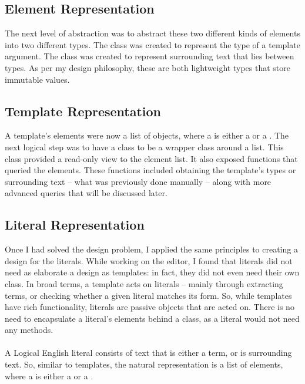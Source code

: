 \documentclass[../main.tex]{subfiles}
\begin{document}
\subsection{Element Representation}
The next level of abstraction was to abstract these two different kinds of elements into two different types.
The class  was created to represent the type of a template argument. The class  was created to represent surrounding text that lies between types. As per my design philosophy, these are both lightweight types that store immutable values.

\subsection{Template Representation}
A template's elements were now a list of  objects, where a  is either a  or a .
The next logical step was to have a  class to be a wrapper class around a  list. This  class provided a read-only view to the element list. It also exposed functions that queried the elements. These functions included obtaining the template's types or surrounding text -- what was previously done manually -- along with more advanced queries that will be discussed later.

\subsection{Literal Representation}
Once I had solved the  design problem, I applied the same principles to creating a design for the literals. While working on the editor, I found that literals did not need as elaborate a design as templates: in fact, they did not even need their own class. In broad terms, a template acts on literals -- mainly through extracting terms, or checking whether a given literal matches its form. So, while templates have rich functionality, literals are passive objects that are acted on. There is no need to encapsulate a literal's elements behind a class, as a literal would not need any methods.
\\
\\
A Logical English literal consists of text that is either a term, or is surrounding text. So, similar to templates, the natural representation is a list of  elements, where a  is either a  or a .
\end{document}
